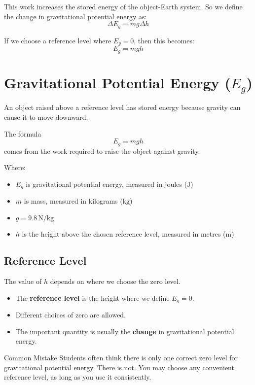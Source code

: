 This work increases the stored energy of the object-Earth system. So we define the change in gravitational potential energy as:
\begin{equation}
    \Delta E_g = mg \Delta h
\end{equation}

If we choose a reference level where $E_g = 0$, then this becomes:
\begin{equation}
    E_g = mgh
\end{equation}

\section{Gravitational Potential Energy ($E_g$)}
An object raised above a reference level has stored energy because gravity can cause it to move downward.

The formula
\begin{equation*}
    E_g = mgh
\end{equation*}
comes from the work required to raise the object against gravity.

Where:
\begin{itemize}
    \item $E_g$ is gravitational potential energy, measured in joules ($\text{J}$)
    \item $m$ is mass, measured in kilograms ($\text{kg}$)
    \item $g = 9.8\,\text{N/kg}$
    \item $h$ is the height above the chosen reference level, measured in metres ($\text{m}$)
\end{itemize}

\subsection{Reference Level}
The value of $h$ depends on where we choose the zero level.

\begin{itemize}
    \item The \textbf{reference level} is the height where we define $E_g = 0$.
    \item Different choices of zero are allowed.
    \item The important quantity is usually the \textbf{change} in gravitational potential energy.
\end{itemize}

\begin{pitfall}{Common Mistake}
Students often think there is only one correct zero level for gravitational potential energy. There is not. You may choose any convenient reference level, as long as you use it consistently.
\end{pitfall}

